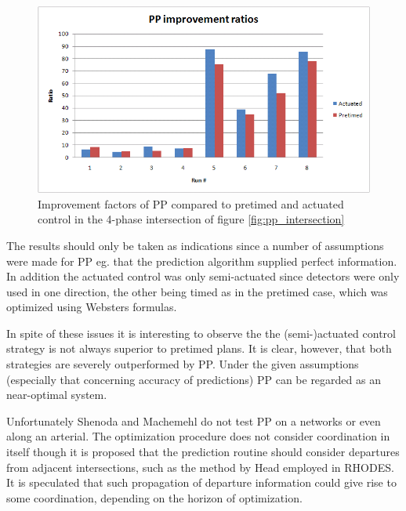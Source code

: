 \begin{figure}[!ht]
\begin{center}
\includegraphics[scale=0.5]{phase-by-phase_improvement_ratios.png} 
\end{center}
\caption{Improvement factors of PP compared to pretimed and actuated control in the 4-phase intersection of figure \ref{fig:pp_intersection}}
\label{fig:pp_improvements}
\end{figure}

The results should only be taken as indications since a number of assumptions were made for PP eg. that the prediction algorithm supplied perfect information. In addition the actuated control was only semi-actuated since detectors were only used in one direction, the other being timed as in the pretimed case, which was optimized using Websters formulas.

In spite of these issues it is interesting to observe the the (semi-)actuated control strategy is not always superior to pretimed plans. It is clear, however, that both strategies are severely outperformed by PP. Under the given assumptions (especially that concerning accuracy of predictions) PP can be regarded as an near-optimal system.

Unfortunately Shenoda and Machemehl do not test PP on a networks or even along an arterial. The optimization procedure does not consider coordination in itself though it is proposed that the prediction routine should consider departures from adjacent intersections, such as the method by Head employed in RHODES. It is speculated that such propagation of departure information could give rise to some coordination, depending on the horizon of optimization.